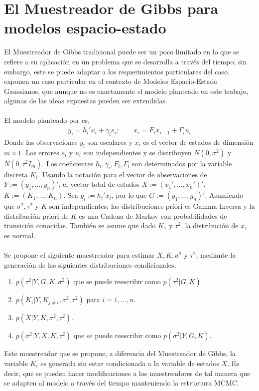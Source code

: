 \section{El Muestreador de Gibbs para modelos espacio-estado}
El Muestreador de Gibbs tradicional puede ser un poco limitado en lo que se refiere a su aplicaci\'on en un problema que se desarrolla a trav\'es del tiempo; sin embargo, este se puede adaptar a los requerimientos particulares del caso. \cite{carter1996markov} exponen un caso particular en el contexto de Modelos Espacio-Estado Gaussianos, que aunque no es exactamente el modelo planteado en este trabajo, algunas de las ideas expuestas pueden ser extendidas.\\
\\
El modelo planteado por \cite{carter1996markov} es,
\begin{align*}
y_i=h_i'x_i+\gamma_ie_i; \qquad x_i=F_ix_{i-1}+\Gamma_iu_i
\end{align*}
Donde las observaciones $y_i$ son escalares y $x_i$ es el vector de estados de dimensi\'on $m\times 1$. Los errores $e_i$ y $u_i$ son independientes y se distribuyen $N(0,\sigma^2)$ y $N(0,\tau^2I_m)$. Los coeficientes $h_i,\gamma_i,F_i,\Gamma_i$ son determinados por la variable discreta $K_i$. Usando la notaci\'on para el vector de observaciones de $Y:=(y_1,...,y_n)'$, el vector total de estados $X:=(x_1',...,x_n')'$, $K:=(K_1,...,K_n)$. Sea $g_i:=h_i'x_i$, por lo que $G:=(g_1,...,g_n)'$. Asumiendo que $\sigma^2, \tau^2$ y $K$ son independientes; las distribuciones priori es Gamma Inversa y la distribuci\'on priori de $K$ es una Cadena de Markov con probabilidades de transici\'on conocidas. Tambi\'en se asume que dado $K_1$ y $\tau^2$, la distribuci\'on de $x_1$ es normal.\\
\\
Se propone el siguiente muestreador para estimar $X,K,\sigma^2$ y $\tau^2$, mediante la generaci\'on de las siguientes distribuciones condicionales,
\begin{enumerate}
\item $p(\tau^2|Y,G,K,\sigma^2)$ que se puede reescribir como $p(\tau^2|G,K)$.
\item $p(K_i|Y,K_{j \neq i},\sigma^2,\tau^2)$ para $i=1,...,n$.
\item $p(X|Y,K,\sigma^2,\tau^2)$.
\item $p(\sigma^2|Y,X,K,\tau^2)$ que se puede reescribir como $p(\sigma^2|Y,G,K)$.
\end{enumerate}
Este muestreador que se propone, a diferencia del Muestreador de Gibbs, la variable $K_i$ es generada sin estar condicionada a la variable de estados $X$. Es decir, que se pueden hacer modificaciones a los muestreadores de tal manera que se adapten al modelo a trav\'es del tiempo manteniendo la estructura MCMC.
